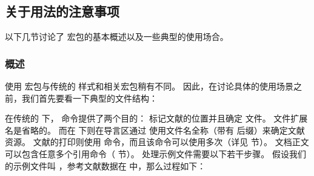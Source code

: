 \subsection{关于用法的注意事项}%
\label{use:use}


以下几节讨论了 \biblatex 宏包的基本概述以及一些典型的使用场合。

\subsubsection{概述}%
\label{use:use:int}


使用 \biblatex 宏包与传统的 \BibTeX 样式和相关宏包稍有不同。
因此，在讨论具体的使用场景之前，我们首先要看一下典型的文件结构：

%
在传统的 \BibTeX 下， 命令提供了两个目的：
标记文献的位置并且确定  文件。
文件扩展名是省略的。
而在 \biblatex 下则在导言区通过  使用文件名全称（带有  后缀）来确定文献资源。
文献的打印则使用  命令，而且该命令可以使用多次（详见  节）。
文档正文可以包含任意多个引用命令（ 节）。
处理示例文件需要以下若干步骤。
假设我们的示例文件叫 ，参考文献数据在  中，那么过程如下：

